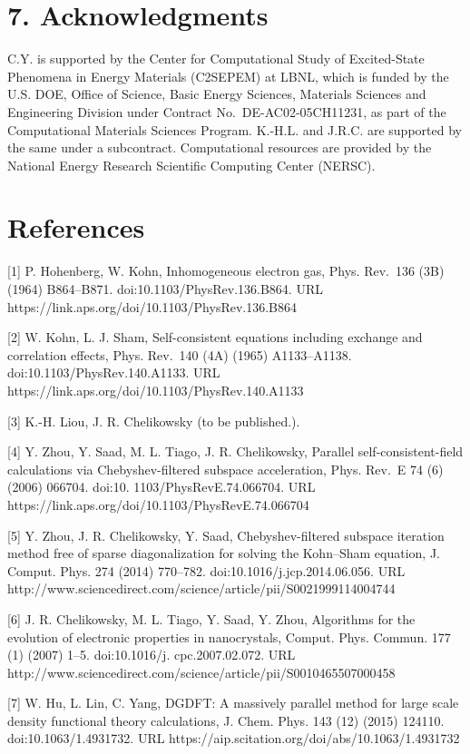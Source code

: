 \documentclass[
  10
]{article}
\begin{document}
\section{7. Acknowledgments}\label{acknowledgments}

C.Y. is supported by the Center for Computational Study of Excited-State
Phenomena in Energy Materials (C2SEPEM) at LBNL, which is funded by the
U.S. DOE, Office of Science, Basic Energy Sciences, Materials Sciences
and Engineering Division under Contract No.~DE-AC02-05CH11231, as part
of the Computational Materials Sciences Program. K.-H.L. and J.R.C. are
supported by the same under a subcontract. Computational resources are
provided by the National Energy Research Scientific Computing Center
(NERSC).

\section{References}\label{references}

{[}1{]} P. Hohenberg, W. Kohn, Inhomogeneous electron gas, Phys.
Rev.~136 (3B) (1964) B864--B871. doi:10.1103/PhysRev.136.B864. URL
https://link.aps.org/doi/10.1103/PhysRev.136.B864

{[}2{]} W. Kohn, L. J. Sham, Self-consistent equations including
exchange and correlation effects, Phys. Rev.~140 (4A) (1965)
A1133--A1138. doi:10.1103/PhysRev.140.A1133. URL
https://link.aps.org/doi/10.1103/PhysRev.140.A1133

{[}3{]} K.-H. Liou, J. R. Chelikowsky (to be published.).

{[}4{]} Y. Zhou, Y. Saad, M. L. Tiago, J. R. Chelikowsky, Parallel
self-consistent-field calculations via Chebyshev-filtered subspace
acceleration, Phys. Rev.~E 74 (6) (2006) 066704. doi:10.
1103/PhysRevE.74.066704. URL
https://link.aps.org/doi/10.1103/PhysRevE.74.066704

{[}5{]} Y. Zhou, J. R. Chelikowsky, Y. Saad, Chebyshev-filtered subspace
iteration method free of sparse diagonalization for solving the
Kohn--Sham equation, J. Comput. Phys. 274 (2014) 770--782.
doi:10.1016/j.jcp.2014.06.056. URL
http://www.sciencedirect.com/science/article/pii/S0021999114004744

{[}6{]} J. R. Chelikowsky, M. L. Tiago, Y. Saad, Y. Zhou, Algorithms for
the evolution of electronic properties in nanocrystals, Comput. Phys.
Commun. 177 (1) (2007) 1--5. doi:10.1016/j. cpc.2007.02.072. URL
http://www.sciencedirect.com/science/article/pii/S0010465507000458

{[}7{]} W. Hu, L. Lin, C. Yang, DGDFT: A massively parallel method for
large scale density functional theory calculations, J. Chem. Phys. 143
(12) (2015) 124110. doi:10.1063/1.4931732. URL
https://aip.scitation.org/doi/abs/10.1063/1.4931732
\end{document}
